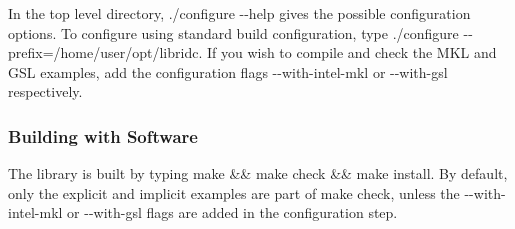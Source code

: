 In the top level directory, {\ttfamily ./configure -\/-\/help} gives the possible configuration options. To configure using standard build configuration, type {\ttfamily ./configure -\/-\/prefix=/home/user/opt/libridc}. If you wish to compile and check the M\+K\+L and G\+S\+L examples, add the configuration flags {\ttfamily -\/-\/with-\/intel-\/mkl} or {\ttfamily -\/-\/with-\/gsl} respectively.

\subsubsection*{Building with Software}

The library is built by typing {\ttfamily make \&\& make check \&\& make install}. By default, only the explicit and implicit examples are part of make check, unless the {\ttfamily -\/-\/with-\/intel-\/mkl} or {\ttfamily -\/-\/with-\/gsl} flags are added in the configuration step. 